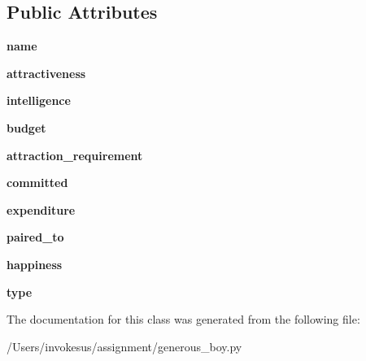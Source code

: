 \subsection*{Public Attributes}
\begin{DoxyCompactItemize}
\item 
\mbox{\label{classgenerous__boy_1_1_generous___boy_afd3c6e06f846ba4296d01295d72a2761}} 
{\bfseries name}
\item 
\mbox{\label{classgenerous__boy_1_1_generous___boy_a21fd9c49689d0def38d62a5f3bc267eb}} 
{\bfseries attractiveness}
\item 
\mbox{\label{classgenerous__boy_1_1_generous___boy_a9ca95d569e31ac9f1fafc8c98c0d24ff}} 
{\bfseries intelligence}
\item 
\mbox{\label{classgenerous__boy_1_1_generous___boy_aacff3eee77e181ca4e813b8d3739db4f}} 
{\bfseries budget}
\item 
\mbox{\label{classgenerous__boy_1_1_generous___boy_a4042ce73df5df4644d0468d19ef9b4ef}} 
{\bfseries attraction\+\_\+requirement}
\item 
\mbox{\label{classgenerous__boy_1_1_generous___boy_a3093f9f591a9fbcae8209df25d73817a}} 
{\bfseries committed}
\item 
\mbox{\label{classgenerous__boy_1_1_generous___boy_a9e51187bb8da4d5a31b94e568a00f745}} 
{\bfseries expenditure}
\item 
\mbox{\label{classgenerous__boy_1_1_generous___boy_a88dc19afb1baaa99e8256f3f7d40309c}} 
{\bfseries paired\+\_\+to}
\item 
\mbox{\label{classgenerous__boy_1_1_generous___boy_a7461b9bcdb7f0531e3cd9ba2b48aa535}} 
{\bfseries happiness}
\item 
\mbox{\label{classgenerous__boy_1_1_generous___boy_a23cec95ad272bb25b7b3be28e07fff43}} 
{\bfseries type}
\end{DoxyCompactItemize}


The documentation for this class was generated from the following file\+:\begin{DoxyCompactItemize}
\item 
/\+Users/invokesus/assignment/generous\+\_\+boy.\+py\end{DoxyCompactItemize}
